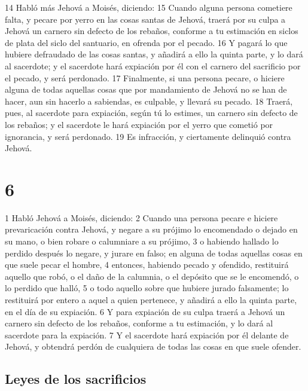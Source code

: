 14 Habló más Jehová a Moisés, diciendo:
15 Cuando alguna persona cometiere falta, y pecare por yerro en las cosas santas de Jehová, traerá por su culpa a Jehová un carnero sin defecto de los rebaños, conforme a tu estimación en siclos de plata   del siclo del santuario, en ofrenda por el pecado.
16 Y pagará lo que hubiere defraudado de las cosas santas, y añadirá a ello la quinta parte, y lo dará al sacerdote; y el sacerdote hará expiación por él con el carnero del sacrificio por el pecado, y será perdonado.
17 Finalmente, si una persona pecare, o hiciere alguna de todas aquellas cosas que por mandamiento de Jehová no se han de hacer, aun sin hacerlo a sabiendas, es culpable, y llevará su pecado.
18 Traerá, pues, al sacerdote para expiación, según tú lo estimes, un carnero sin defecto de los rebaños; y el sacerdote le hará expiación por el yerro que cometió por ignorancia, y será perdonado.
19 Es infracción, y ciertamente delinquió contra Jehová.  

\chapter{6}

1 Habló Jehová a Moisés, diciendo:
2 Cuando una persona pecare e hiciere prevaricación contra Jehová, y negare a su prójimo lo encomendado o dejado en su mano, o bien robare o calumniare a su prójimo,
3 o habiendo hallado lo perdido después lo negare, y jurare en falso; en alguna de todas aquellas cosas en que suele pecar el hombre,
4 entonces, habiendo pecado y ofendido, restituirá aquello que robó, o el daño de la calumnia, o el depósito que se le encomendó, o lo perdido que halló,
5 o todo aquello sobre que hubiere jurado falsamente; lo restituirá por entero a aquel a quien pertenece, y añadirá a ello la quinta parte, en el día de su expiación.
6 Y para expiación de su culpa traerá a Jehová un carnero sin defecto de los rebaños, conforme a tu estimación, y lo dará al sacerdote para la expiación.
7 Y el sacerdote hará expiación por él delante de Jehová, y obtendrá perdón de cualquiera de todas las cosas en que suele ofender.  

\section{Leyes de los sacrificios}

